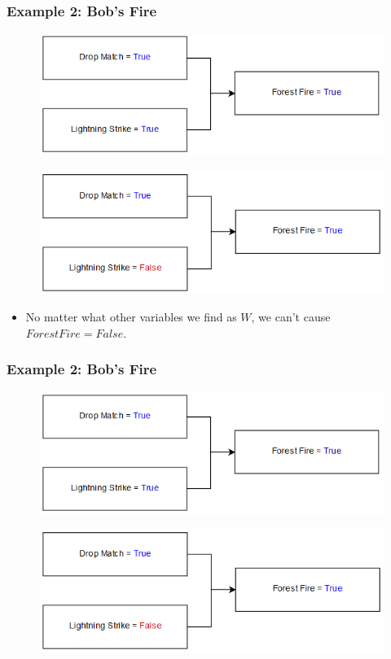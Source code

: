 \documentclass{beamer}
\theoremstyle{plain}
\theoremstyle{definition}
\begin{document}
\begin{frame}
\frametitle{Example 2: Bob's Fire}
\begin{figure}
\includegraphics[scale=.5]{bobModelReal}
\end{figure}

\begin{figure}
\includegraphics[scale=.5]{bobModelCounterfactual}
\end{figure}
\begin{itemize}
\item No matter what other variables we find as $W$, we can't cause $Forest Fire = False$.
\end{itemize}
\end{frame}

\begin{frame}
\frametitle{Example 2: Bob's Fire}
\begin{figure}
\includegraphics[scale=.5]{bobModelReal}
\end{figure}

\begin{figure}
\includegraphics[scale=.5]{bobModelCounterfactual}
\end{figure}
\end{frame}
\end{document}
